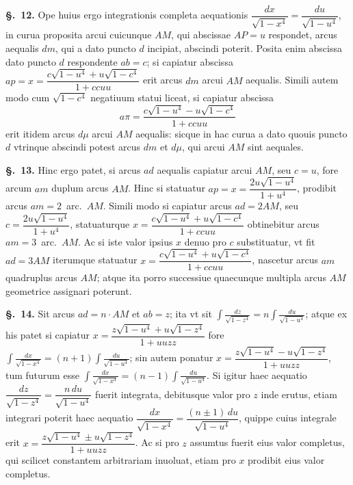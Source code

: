 \documentclass{article}
\begin{document}
\textbf{§.~12.} Ope huius ergo integrationis completa aequationis
$\dfrac{dx}{\sqrt{1-x^{4}}} = \dfrac{du}{\sqrt{1-u^{4}}}$, in curua proposita arcui cuicunque $AM$,
qui abscissae $AP = u$ respondet, arcus aequalis $dm$, qui a dato puncto $d$ incipiat, abscindi
poterit. Posita enim abscissa dato puncto $d$ respondente $ab = c$; si capiatur abscissa
$ap = x = \dfrac{c\sqrt{1-u^{4}} + u\sqrt{1-c^{4}}}{1+ccuu}$ erit arcus $dm$ arcui $AM$ aequalis.
Simili autem modo cum $\sqrt{1-c^{4}}$ negatiuum statui liceat, si capiatur abscissa
\[ a\pi = \frac{c\sqrt{1-u^{4}} - u\sqrt{1-c^{4}}}{1+ccuu} \]
erit itidem arcus $d\mu$ arcui $AM$ aequalis: sicque in hac curua a dato quouis puncto $d$ vtrinque
abscindi potest arcus $dm$ et $d\mu$, qui arcui $AM$ sint aequales.

\textbf{§.~13.} Hinc ergo patet, si arcus $ad$ aequalis capiatur arcui $AM$, seu $c = u$, fore
arcum $am$ duplum arcus $AM$. Hinc si statuatur $ap = x = \dfrac{2u\sqrt{1-u^{4}}}{1+u^{4}}$,
prodibit arcus $am = 2$~arc.~$AM$. Simili modo si capiatur arcus $ad = 2AM$, seu
$c = \dfrac{2u\sqrt{1-u^{4}}}{1+u^{4}}$, statuaturque
$x = \dfrac{c\sqrt{1-u^{4}} + u\sqrt{1-c^{4}}}{1+ccuu}$ obtinebitur arcus $am = 3$~arc.~$AM$. Ac si
iste valor ipsius $x$ denuo pro $c$ substituatur, vt fit $ad = 3AM$ iterumque statuatur
$x = \dfrac{c\sqrt{1-u^{4}} + u\sqrt{1-c^{4}}}{1+ccuu}$, nascetur arcus $am$ quadruplus arcus $AM$;
atque ita porro successiue quaecunque multipla arcus $AM$ geometrice assignari poterunt.

\textbf{§.~14.} Sit arcus $ad = n \cdot AM$ et $ab = z$; ita vt sit
$\displaystyle\int \frac{dz}{\sqrt{1-z^{4}}} = n\int \frac{du}{\sqrt{1-u^{4}}}$; atque ex his patet si capiatur
$x = \dfrac{z\sqrt{1-u^{4}} + u\sqrt{1-z^{4}}}{1+uuzz}$ fore
$\displaystyle\int \frac{dx}{\sqrt{1-x^{4}}} = (n+1)\int \frac{du}{\sqrt{1-u^{4}}}$; sin autem ponatur
$x = \dfrac{z\sqrt{1-u^{4}} - u\sqrt{1-z^{4}}}{1+uuzz}$, tum futurum esse
$\displaystyle\int \frac{dx}{\sqrt{1-x^{4}}} = (n-1)\int \frac{du}{\sqrt{1-u^{4}}}$. Si igitur haec aequatio
$\dfrac{dz}{\sqrt{1-z^{4}}} = \dfrac{n\,du}{\sqrt{1-u^{4}}}$ fuerit integrata, debitusque valor pro
$z$ inde erutus, etiam integrari poterit haec aequatio
$\dfrac{dx}{\sqrt{1-x^{4}}} = \dfrac{(n\pm1)\,du}{\sqrt{1-u^{4}}}$, quippe cuius integrale erit
$x = \dfrac{z\sqrt{1-u^{4}} \pm u\sqrt{1-z^{4}}}{1+uuzz}$. Ac si pro $z$ assumtus fuerit eius valor
completus, qui scilicet constantem arbitrariam inuoluat, etiam pro $x$ prodibit eius valor
completus.
\end{document}
